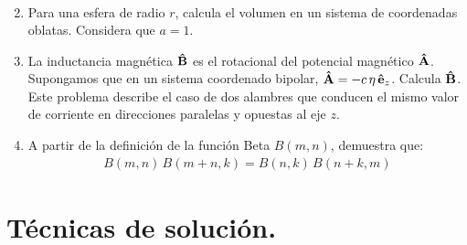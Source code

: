 \begin{enumerate}
\begin{align*}
\end{align*}
\item Para una esfera de radio $r$, calcula el volumen en un sistema de coordenadas oblatas. Considera que $a = 1$.
\item La inductancia magnética $\vu{B}$ es el rotacional del potencial magnético $\vu{A}$. Supongamos que en un sistema coordenado bipolar, $\vu{A} = - c \, \eta \, \vu{e}_{z}$. Calcula $\vu{B}$. Este problema describe el caso de dos alambres que conducen el mismo valor de corriente en direcciones paralelas y opuestas al eje $z$.
\item A partir de la definición de la función Beta $B(m, n)$, demuestra que:
\begin{align*}
B(m, n) \, B(m + n, k) = B(n, k) \, B(n + k, m)
\end{align*}
\end{enumerate}

\section{Técnicas de solución.}

